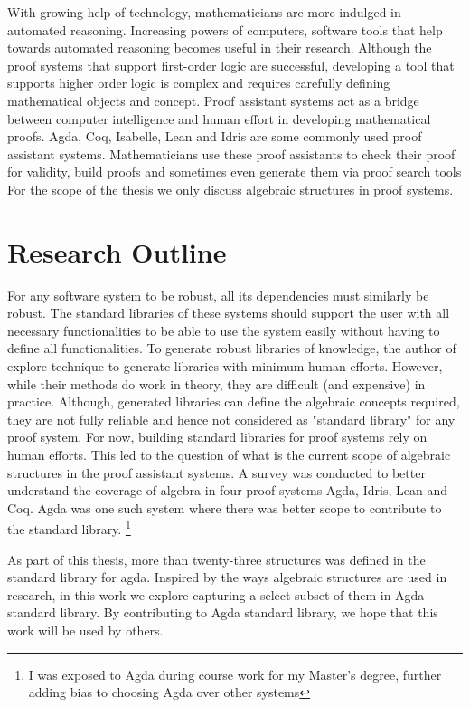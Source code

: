 With growing help of technology, mathematicians are more indulged in automated
reasoning. Increasing powers of computers, software tools that help towards
automated reasoning becomes useful in their research. Although the proof systems
that support first-order logic are successful, developing a tool that supports
higher order logic is complex \cite{phillips2010automated} and requires
carefully defining mathematical objects and concept. Proof assistant systems act
as a bridge between computer intelligence and human effort in developing
mathematical proofs. Agda, Coq, Isabelle, Lean and Idris are some commonly used
proof assistant systems. Mathematicians use these proof assistants to check their
proof for validity, build proofs and sometimes even generate them via proof
search tools  For the scope of the thesis we only discuss algebraic
structures in proof systems.\\


\section{Research Outline}
For any software system to be robust, all its dependencies must similarly be
robust. The standard libraries of these systems should support the user with all
necessary functionalities to be able to use the system easily without having to
define all functionalities. To generate robust libraries of knowledge, the
author of \cite{BuildingDiamond} explore technique to generate libraries with
minimum human efforts. However, while their methods do work in theory, they are
difficult (and expensive) in practice. Although, generated libraries can define
the algebraic concepts required, they are not fully reliable and hence not
considered as "standard library" for any proof system. For now, building
standard libraries for proof systems rely on human efforts. This led to the
question of what is the current scope of algebraic structures in the proof
assistant systems. A survey was conducted to better understand the coverage of
algebra in four proof systems Agda, Idris, Lean and Coq. Agda was one such
system where there was better scope to contribute to the standard library.
\footnote{I was exposed to Agda during course work for my Master's degree,
further adding bias to choosing Agda over other systems} 

As part of this thesis, more than twenty-three structures was defined in the
standard library for agda. Inspired by the ways algebraic structures are used in
research, in this work we explore capturing a select subset of them in Agda
standard library. By contributing to Agda standard library, we hope that this
work will be used by others.

